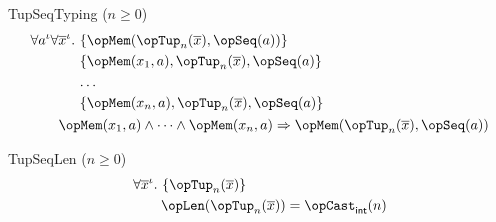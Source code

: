 \documentclass[11pt, a4paper, oneside]{article}
\begin{document}
\begin{axioms}
\item[TupSeqTyping ($n \ge 0$)] \[
        \begin{aligned}
            &\forall a^\idv \forall \overline{x}^\idv.\, \begin{aligned}[t]
                &\st{ \opMem(\opTup_n(\overline{x}), \opSeq(a)) } \\
                &\st{ \opMem(x_1, a), \opTup_n(\overline{x}), \opSeq(a) } \\
                & \dots \\
                &\st{ \opMem(x_n, a), \opTup_n(\overline{x}), \opSeq(a) }
            \end{aligned} \\
            &\qquad \opMem(x_1, a) \wedge \dots \wedge \opMem(x_n, a) \imp \opMem(\opTup_n(\overline{x}), \opSeq(a))
        \end{aligned}
    \]

\item[TupSeqLen ($n \ge 0$)] \[
        \begin{aligned}
            &\forall \overline{x}^\idv.\, \st{ \opTup_n(\overline{x}) } \\
            &\qquad \opLen(\opTup_n(\overline{x})) = \opCast_\int(n)
        \end{aligned}
    \]

\end{axioms}
\end{document}
